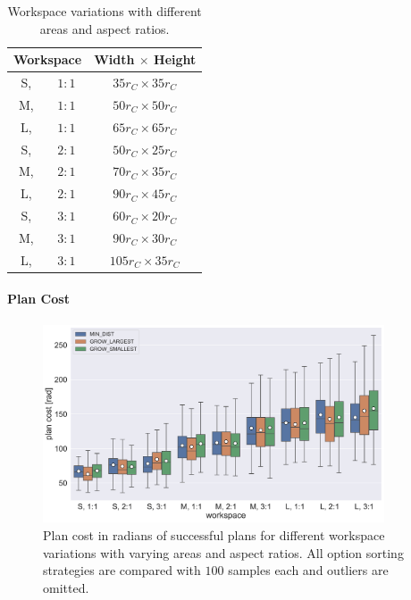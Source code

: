 \begin{table}
	\centering
	\begin{tabular}{|c c|c|}
		\hline
		\multicolumn{2}{|c|}{\textbf{Workspace}} & \textbf{Width $\times$ Height}\\
		\hline
		S,& $ 1:1 $ & $35 r_C \times 35 r_C$\\
		\hline
		M,& $ 1:1 $ & $50 r_C \times 50 r_C$ \\
		\hline
		L,& $ 1:1 $ & $65 r_C \times 65 r_C$ \\
		\hline
		S,& $ 2:1 $ & $50 r_C \times 25 r_C$\\
		\hline
		M,& $ 2:1 $ & $70 r_C \times 35 r_C$ \\
		\hline
		L,& $ 2:1 $ & $90 r_C \times 45 r_C$ \\
		\hline
		S,& $ 3:1 $ & $60 r_C \times 20 r_C$\\
		\hline
		M,& $ 3:1 $ & $90 r_C \times 30 r_C$ \\
		\hline
		L,& $ 3:1 $ & $105 r_C \times 35 r_C$ \\
		\hline
	\end{tabular}
	\caption{Workspace variations with different areas and aspect ratios.}
	\label{tab:workspaces}
\end{table}

\paragraph{Plan Cost} 

\begin{figure}
	\centering
	\includegraphics[width=0.9\textwidth]{figures/plots/AFBS_cost.pdf}
	\caption[Plan cost for workspace variations]{Plan cost in radians of successful plans for different workspace variations with varying areas and aspect ratios. All option sorting strategies are compared with $100$ samples each and outliers are omitted.}
	\label{fig:AFBS_cost}
\end{figure}

